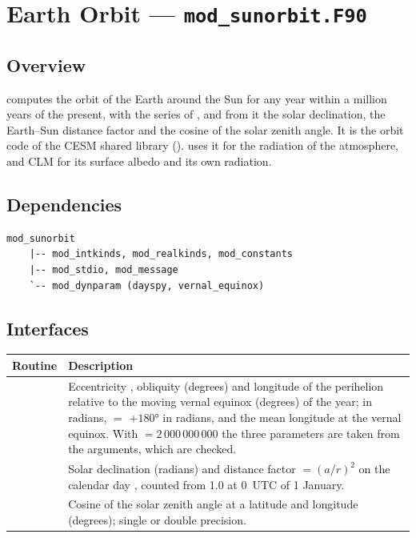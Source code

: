 \section{Earth Orbit --- \texttt{mod\_sunorbit.F90}}
\label{sec:sunorbit}

\subsection{Overview}

 computes the orbit of the Earth around the Sun for any
year within a million years of the present, with the series of
\citet{berger1978}, and from it the solar declination, the Earth--Sun
distance factor and the cosine of the solar zenith angle. It is the orbit
code of the CESM shared library (). 
uses it for the radiation of the atmosphere, and CLM for its surface
albedo and its own radiation.

\subsection{Dependencies}

\begin{lstlisting}
mod_sunorbit
    |-- mod_intkinds, mod_realkinds, mod_constants
    |-- mod_stdio, mod_message
    `-- mod_dynparam (dayspy, vernal_equinox)
\end{lstlisting}

\subsection{Interfaces}

\begin{longtable}{L{5.8cm} L{8.2cm}}
  \toprule
  \textbf{Routine} & \textbf{Description} \\
  \midrule
  \endhead
  \bottomrule
  \endfoot
   &
    Eccentricity , obliquity  (degrees) and
    longitude of the perihelion relative to the moving vernal equinox
     (degrees) of the year;  in radians,
     $=$  $+ 180°$ in radians, and the mean
    longitude  at the vernal equinox. With
     $= 2\,000\,000\,000$ the three parameters are taken from the
    arguments, which are checked. \\
   &
    Solar declination  (radians) and distance factor
     $= (a/r)^2$ on the calendar day , counted from
    1.0 at 0~UTC of 1 January. \\
   &
    Cosine of the solar zenith angle at a latitude and longitude (degrees);
    single or double precision. \\
\end{longtable}

